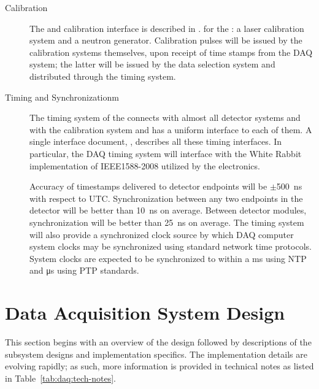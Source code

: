 \begin{description}
\item[Calibration] The  and calibration interface is described in
  .
  for the : a laser calibration
  system and a neutron generator.
  Calibration pulses will be issued by the calibration systems themselves, upon
  receipt of time stamps from the DAQ system; %
  the latter will be issued by the data selection system and distributed through
  the  timing system.

\item[Timing and Synchronizationm] The timing system of the 
   connects with almost all detector systems and with the calibration
  system and has a uniform interface to each of them. 
  A single interface document, , describes all these timing
  interfaces. 
  In particular, the DAQ timing system will interface with the White Rabbit
  implementation of IEEE1588-2008 utilized by the  electronics.

  Accuracy of timestamps delivered to detector endpoints will be
  $\pm$\SI{500}{\nano\second} with respect to UTC.
  Synchronization between any two endpoints in the detector will be better than
  \SI{10}{\nano\second} on average.
  Between detector modules, synchronization will be better than
  \SI{25}{\nano\second} on average.
  The timing system will also provide a synchronized clock source by which DAQ
  computer system clocks may be synchronized using standard network time
  protocols.
  System clocks are expected to be synchronized to within a ms using NTP and
  \si{\micro\second} using PTP standards.

\end{description}

\section{Data Acquisition System Design}
\label{sec:daq:design}

This section begins with an overview of the  design followed by
descriptions of the subsystem designs and implementation specifics.
The implementation details are evolving rapidly; as such, more information is
provided in technical notes as listed in Table~\ref{tab:daq:tech-notes}. 


